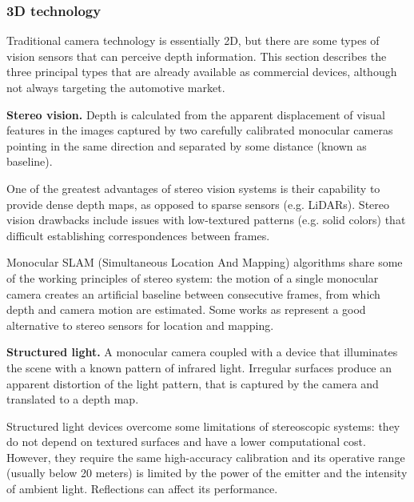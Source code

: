 \documentclass[journal]{IEEEtran}
\begin{document}
\subsubsection{3D technology}
Traditional camera technology is essentially 2D, but there are some
types of vision sensors that can perceive depth information. This section
describes the three principal types that are already available as commercial
devices, although not always targeting the automotive market.

\textbf{Stereo vision.} Depth is calculated \cite{Hamzah2016} from the 
apparent displacement of visual features in the images captured by two 
carefully calibrated monocular cameras pointing in the same direction and
separated by some distance (known as baseline). 

One of the greatest advantages of stereo vision systems is their capability 
to provide dense depth maps, as opposed to sparse sensors (e.g. LiDARs).  
Stereo vision drawbacks include issues with low-textured patterns 
(e.g. solid colors) that difficult establishing correspondences between
frames.

Monocular SLAM (Simultaneous Location And Mapping) algorithms share some of the
working principles of stereo system: the motion of a single monocular camera 
creates an artificial baseline between consecutive frames, from which depth and
camera motion are estimated.
Some works as \cite{Engel2014, Engel2018} represent a good alternative to
stereo sensors for location and mapping. 

\textbf{Structured light.} A monocular camera coupled with a device that
illuminates the scene with a known pattern of infrared light. 
Irregular surfaces produce an apparent distortion of the light pattern, that is
captured by the camera and translated to a depth map.

Structured light devices overcome some limitations of stereoscopic systems:
they do not depend on textured surfaces and have a lower computational cost. 
However, they require the same high-accuracy calibration \cite{Garbat2013}
and its operative range (usually below 20 meters) is limited by the power of
the emitter and the intensity of ambient light. Reflections can affect its
performance.

\end{document}
